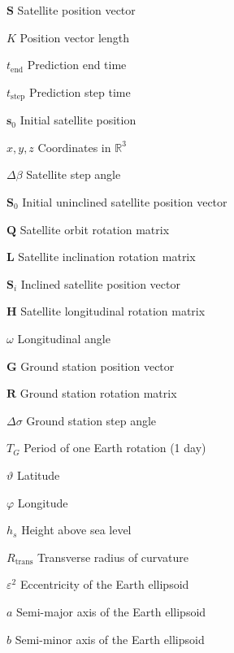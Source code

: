 \begin{Nomencl}[\gnat]
		\item[$\mathbf{S}$]				Satellite position vector
		\item[$K$]							Position vector length
		\item[$t_{\textrm{end}}$]		Prediction end time
		\item[$t_{\textrm{step}}$]	Prediction step time
		\item[$\mathbf{s}_0$]			Initial satellite position
		\item[$x,y,z$]						Coordinates in $\mathbb{R}^3$
		\item[$\Delta\beta$]		Satellite step angle
		\item[$\mathbf{S}_{0}$]		Initial uninclined satellite position vector
		\item[$\mathbf{Q}$]			Satellite orbit rotation matrix
		\item[$\mathbf{L}$]				Satellite inclination rotation matrix
		\item[$\mathbf{S}_i$]			Inclined satellite position vector
		\item[$\mathbf{H}$]				Satellite longitudinal rotation matrix
		\item[$\omega$]					Longitudinal angle
		
		\item[$\mathbf{G}$]			Ground station position vector
		\item[$\mathbf{R}$]				Ground station rotation matrix
		\item[$\Delta\sigma$]	Ground station step angle
		\item[$T_G$]						Period of one Earth rotation (1 day)
		\item[$\vartheta$]				Latitude
		\item[$\varphi$]					Longitude
		\item[$h_s$]						Height above sea level
		\item[$R_{\textrm{trans}}$]	Transverse radius of curvature
		\item[$\varepsilon^2$]			Eccentricity of the Earth ellipsoid
		\item[$a$]							Semi-major axis of the Earth ellipsoid
		\item[$b$]							Semi-minor axis of the Earth ellipsoid


\end{Nomencl}
